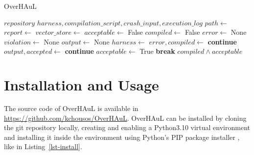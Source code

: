 \documentclass[
  a4paper,
  DIV=11,
  numbers=noendperiod]{scrreprt}
\theoremstyle{definition}
\theoremstyle{remark}
\begin{document}
\begin{algorithm}[H]
\caption{OverHAuL}
\label{alg-main}
\begin{algorithmic}[1]
\Require $repository$
\Ensure $harness, compilation\_script, crash\_input, execution\_log$
  \State $path \gets$ 
  \State $report \gets$ 
  \State $vector\_store \gets$ 
  \State $acceptable \gets$ False
  \State $compiled \gets$ False
  \State $error \gets$ None
  \State $violation \gets$ None
  \State $output \gets$ None
    \State $harness \gets$ 
    \State $error, compiled \gets$ 
      \State \textbf{continue} 
    \EndIf
    \State $output, accepted \gets $
      \State \textbf{continue} 
    \Else
      \State $acceptable \gets$ True
      \State \textbf{break}
    \EndIf
  \EndFor
  \State \Return $compiled \land acceptable$
\end{algorithmic}
\end{algorithm}

\section{Installation and Usage}\label{sec-install}

The source code of OverHAuL is available in
\url{https://github.com/kchousos/OverHAuL}. OverHAuL can be installed by
cloning the git repository locally, creating and enabling a Python3.10
virtual environment \autocite{venv} and installing it inside the
environment using Python's PIP package installer \autocite{pip}, like in
Listing~\ref{lst-install}.
\end{document}
